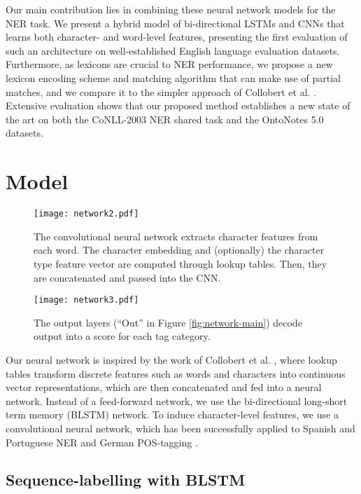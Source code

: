 \documentclass[11pt,letterpaper]{article}
\begin{document}
Our main contribution lies in combining these neural network models for the NER task. We present a hybrid model of bi-directional LSTMs and CNNs that learns both character- and word-level features, presenting the first evaluation of such an architecture on well-established English language evaluation datasets. Furthermore, as lexicons are crucial to NER performance, we propose a new lexicon encoding scheme and matching algorithm that can make use of partial matches, and we compare it to the simpler approach of Collobert et al. . Extensive evaluation shows that our proposed method establishes a new state of the art on both the CoNLL-2003 NER shared task and the OntoNotes 5.0 datasets.

\section{Model}


\begin{figure}[t]
\hspace{2mm}
\texttt{[image: network2.pdf]} 
\caption{The convolutional neural network extracts character features from each word. The character embedding and (optionally) the character type feature vector are computed through lookup tables. Then, they are concatenated and passed into the CNN.}
\label{fig:network-cnn}
\end{figure}

\begin{figure}[t]
\hspace{11mm}
\texttt{[image: network3.pdf]} 
\caption{The output layers (``Out'' in Figure  \ref{fig:network-main}) decode output into a score for each tag category.}
\label{fig:network-out}
\end{figure}

Our neural network is inspired by the work of Collobert et al. , where lookup tables transform discrete features such as words and characters into continuous vector representations, which are then concatenated and fed into a neural network. Instead of a feed-forward network, we use the bi-directional long-short term memory (BLSTM) network. To induce character-level features, we use a convolutional neural network, which has been successfully applied to Spanish and Portuguese NER \cite{dos2015} and German POS-tagging \cite{labeau2015}.


\subsection{Sequence-labelling with BLSTM}
\end{document}
